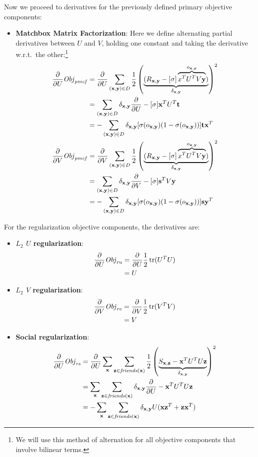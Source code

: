 Now we proceed to derivatives for the previously defined primary
objective components:
\begin{itemize}
\item {\bf Matchbox Matrix Factorization}:
Here we define alternating partial derivatives between $U$ and $V$, holding one
constant and taking the derivative w.r.t.\ the other:\footnote{We will use
this method of alternation for all objective components that involve bilinear
terms.}
\begin{align*}
\frac{\partial}{\partial U} \mathit{Obj}_{\mathit{pmcf}} & = \frac{\partial}{\partial U} \sum_{(\mathbf{x},\mathbf{y}) \in D} \frac{1}{2} \left( \underbrace{(R_{\mathbf{x},\mathbf{y}} - [\sigma] \overbrace{x^T U^T V\mathbf{y}}^{o_{\mathbf{x},\mathbf{y}}})}_{\delta_{\mathbf{x},\mathbf{y}}} \right)^2\\
& = \sum_{(\mathbf{x},\mathbf{y}) \in D} \delta_{\mathbf{x},\mathbf{y}} \frac{\partial}{\partial U} - [\sigma] \mathbf{x}^T U^T \mathbf{t} \\
& = - \sum_{(\mathbf{x},\mathbf{y}) \in D} \delta_{\mathbf{x},\mathbf{y}} [\sigma(o_{\mathbf{x},\mathbf{y}}) (1 - \sigma(o_{\mathbf{x},\mathbf{y}}))] \mathbf{t} \mathbf{x}^T \\
\frac{\partial}{\partial V} \mathit{Obj}_{\mathit{pmcf}} & = \frac{\partial}{\partial V} \sum_{(\mathbf{x},\mathbf{y}) \in D} \frac{1}{2} \left( \underbrace{(R_{\mathbf{x},\mathbf{y}} - [\sigma] \overbrace{x^T U^T V\mathbf{y}}^{o_{\mathbf{x},\mathbf{y}}})}_{\delta_{\mathbf{x},\mathbf{y}}} \right)^2\\
& = \sum_{(\mathbf{x},\mathbf{y}) \in D} \delta_{\mathbf{x},\mathbf{y}} \frac{\partial}{\partial V} - [\sigma] \mathbf{s}^T V \mathbf{y} \\
& = - \sum_{(\mathbf{x},\mathbf{y}) \in D} \delta_{\mathbf{x},\mathbf{y}} [\sigma(o_{\mathbf{x},\mathbf{y}}) (1 - \sigma(o_{\mathbf{x},\mathbf{y}}))] \mathbf{s} \mathbf{y}^T
\end{align*}
\end{itemize}

For the regularization objective components, the derivatives are:

\begin{itemize}
\item {\bf $L_2$ $U$ regularization}:
\begin{align*}
\frac{\partial}{\partial U} \mathit{Obj}_{\mathit{ru}} & = \frac{\partial}{\partial U} \frac{1}{2} \operatorname{tr}(U^T U) \\
& = U
\end{align*}
\item {\bf $L_2$ $V$ regularization}:
\begin{align*}
\frac{\partial}{\partial V} \mathit{Obj}_{\mathit{rv}} & = \frac{\partial}{\partial V} \frac{1}{2} \operatorname{tr}(V^T V) \\
& = V
\end{align*}
\item {\bf Social regularization}:
\begin{align*}
\frac{\partial}{\partial U} \mathit{Obj}_{\mathit{rs}} & = \frac{\partial}{\partial U} \sum_{\mathbf{x}} \sum_{\mathbf{z} \in \mathit{friends}(\mathbf{x})} \frac{1}{2} \left( \underbrace{S_{\mathbf{x},\mathbf{z}} - \mathbf{x}^T U^T U \mathbf{z}}_{\delta_{\mathbf{x},\mathbf{y}}} \right)^2 \\
& = \sum_{\mathbf{x}} \sum_{\mathbf{z} \in \mathit{friends}(\mathbf{x})} \delta_{\mathbf{x},\mathbf{y}} \frac{\partial}{\partial U} - \mathbf{x}^T U^T U \mathbf{z} \\
& = - \sum_{\mathbf{x}} \sum_{\mathbf{z} \in \mathit{friends}(\mathbf{x})} \delta_{\mathbf{x},\mathbf{y}} U (\mathbf{x} \mathbf{z}^T + \mathbf{z} \mathbf{x}^T)
\end{align*}

\end{itemize}


